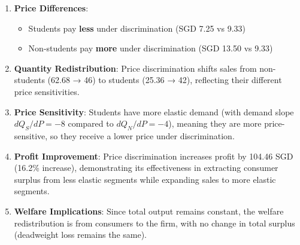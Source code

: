 \documentclass[12pt]{article}
\begin{document}
\begin{enumerate}[label=(\alph*)]
{{\begin{enumerate}
    \item \textbf{Price Differences}:
    \begin{itemize}
        \item Students pay \textbf{less} under discrimination (SGD 7.25 vs 9.33)
        \item Non-students pay \textbf{more} under discrimination (SGD 13.50 vs 9.33)
    \end{itemize}

    \item \textbf{Quantity Redistribution}: Price discrimination shifts sales from non-students (62.68 → 46) to students (25.36 → 42), reflecting their different price sensitivities.

    \item \textbf{Price Sensitivity}: Students have more elastic demand (with demand slope $dQ_S/dP = -8$ compared to $dQ_N/dP = -4$), meaning they are more price-sensitive, so they receive a lower price under discrimination.

    \item \textbf{Profit Improvement}: Price discrimination increases profit by 104.46 SGD (16.2\% increase), demonstrating its effectiveness in extracting consumer surplus from less elastic segments while expanding sales to more elastic segments.

    \item \textbf{Welfare Implications}: Since total output remains constant, the welfare redistribution is from consumers to the firm, with no change in total surplus (deadweight loss remains the same).
\end{enumerate}
}}

\end{enumerate}
\end{document}
